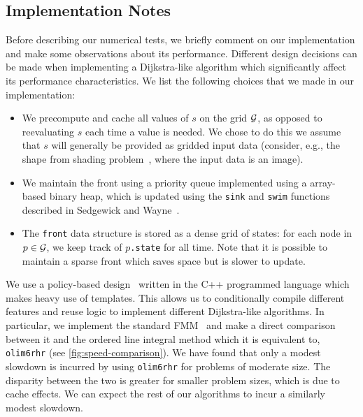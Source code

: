 \documentclass[sisc-eikonal.tex]{subfiles}
\begin{document}
\subsection{Implementation Notes}\label{ssec:impl-notes}

Before describing our numerical tests, we briefly comment on our
implementation and make some observations about its
performance. Different design decisions can be made when implementing
a Dijkstra-like algorithm which significantly affect its performance
characteristics. We list the following choices that we made in our
implementation:
\begin{itemize}
\item We precompute and cache all values of $s$ on the grid $\mathcal{G}$,
  as opposed to reevaluating $s$ each time a value is needed. We chose
  to do this we assume that $s$ will generally be provided as gridded
  input data (consider, e.g., the shape from shading
  problem~\cite{kimmel2001optimal}, where the input data is an image).
\item We maintain the front using a priority queue implemented using a
  array-based binary heap, which is updated using the \texttt{sink}
  and \texttt{swim} functions described in Sedgewick and
  Wayne~\cite{sedgewick2011algorithms}.
\item The \texttt{front} data structure is stored as a dense grid of
  states: for each node in $p \in \mathcal{G}$, we keep track of
  $p$\texttt{.state} for all time. Note that it is possible to
  maintain a sparse front which saves space but is slower to update.
\end{itemize}

We use a policy-based design~\cite{alexandrescu2001modern} written in
the C++ programmed language which makes heavy use of templates. This
allows us to conditionally compile different features and reuse logic
to implement different Dijkstra-like algorithms. In particular, we
implement the standard FMM~\cite{sethian1996fast} and make a direct
comparison between it and the ordered line integral method which it is
equivalent to, \texttt{olim6rhr} (see \cref{fig:speed-comparison}). We
have found that only a modest slowdown is incurred by using
\texttt{olim6rhr} for problems of moderate size. The disparity between
the two is greater for smaller problem sizes, which is due to cache
effects. We can expect the rest of our algorithms to incur a similarly
modest slowdown.
\end{document}
